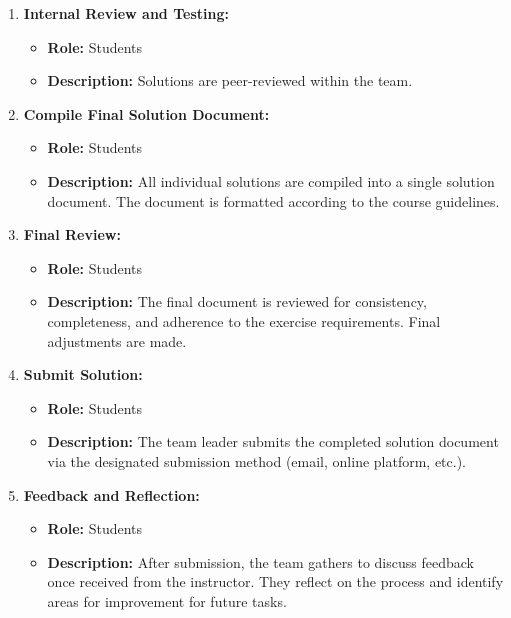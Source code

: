 \documentclass[a4paper]{scrartcl}
\begin{document}
\begin{enumerate}
\begin{enumerate}
      \item \textbf{Internal Review and Testing:}
      \begin{itemize}
          \item \textbf{Role:} Students
          \item \textbf{Description:} Solutions are peer-reviewed within the team. 
      \end{itemize}

      \item \textbf{Compile Final Solution Document:}
      \begin{itemize}
          \item \textbf{Role:} Students
          \item \textbf{Description:} All individual solutions are compiled into a single solution document. The document is formatted according to the course guidelines.
      \end{itemize}

      \item \textbf{Final Review:}
      \begin{itemize}
          \item \textbf{Role:} Students
          \item \textbf{Description:} The final document is reviewed for consistency, completeness, and adherence to the exercise requirements. Final adjustments are made.
      \end{itemize}

      \item \textbf{Submit Solution:}
      \begin{itemize}
          \item \textbf{Role:} Students
          \item \textbf{Description:} The team leader submits the completed solution document via the designated submission method (email, online platform, etc.).
      \end{itemize}

      \item \textbf{Feedback and Reflection:}
      \begin{itemize}
          \item \textbf{Role:} Students
          \item \textbf{Description:} After submission, the team gathers to discuss feedback once received from the instructor. They reflect on the process and identify areas for improvement for future tasks.
      \end{itemize}
  \end{enumerate}
\end{enumerate}
\end{document}
